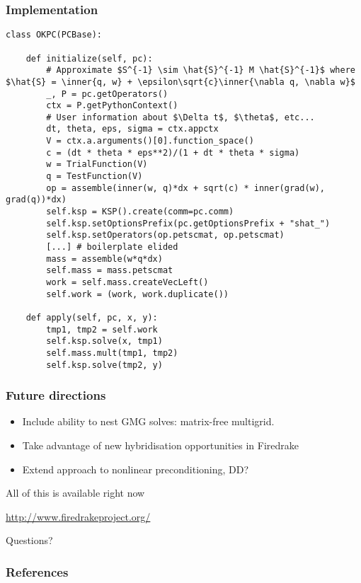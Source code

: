 \documentclass[presentation]{beamer}
\newcommand{\inner}[1]{\left\langle #1 \right \rangle}
\begin{document}
\begin{frame}[fragile]
  \frametitle{Implementation}
\begin{verbatim}
class OKPC(PCBase):

    def initialize(self, pc):
        # Approximate $S^{-1} \sim \hat{S}^{-1} M \hat{S}^{-1}$ where $\hat{S} = \inner{q, w} + \epsilon\sqrt{c}\inner{\nabla q, \nabla w}$
        _, P = pc.getOperators()
        ctx = P.getPythonContext()
        # User information about $\Delta t$, $\theta$, etc...
        dt, theta, eps, sigma = ctx.appctx
        V = ctx.a.arguments()[0].function_space()
        c = (dt * theta * eps**2)/(1 + dt * theta * sigma)
        w = TrialFunction(V)
        q = TestFunction(V)
        op = assemble(inner(w, q)*dx + sqrt(c) * inner(grad(w), grad(q))*dx)
        self.ksp = KSP().create(comm=pc.comm)
        self.ksp.setOptionsPrefix(pc.getOptionsPrefix + "shat_")
        self.ksp.setOperators(op.petscmat, op.petscmat)
        [...] # boilerplate elided
        mass = assemble(w*q*dx)
        self.mass = mass.petscmat
        work = self.mass.createVecLeft()
        self.work = (work, work.duplicate())

    def apply(self, pc, x, y):
        tmp1, tmp2 = self.work
        self.ksp.solve(x, tmp1)
        self.mass.mult(tmp1, tmp2)
        self.ksp.solve(tmp2, y)
\end{verbatim}
\end{frame}

\begin{frame}
  \frametitle{Future directions}
  \begin{itemize}
  \item Include ability to nest GMG solves: matrix-free multigrid.
  \item Take advantage of new hybridisation opportunities in Firedrake
  \item Extend approach to nonlinear preconditioning, DD?
  \end{itemize}
  \begin{center}
    All of this is available right now

    \url{http://www.firedrakeproject.org/}
  \end{center}
\end{frame}

\begin{frame}[standout]
  Questions?
\end{frame}

\appendix
\begin{frame}[t]
  \frametitle{References}
  \printbibliography[heading=none]
\end{frame}
\end{document}
